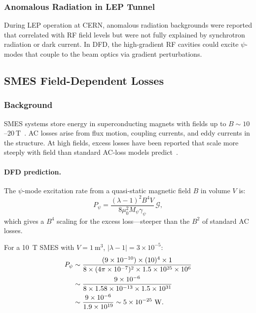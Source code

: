 \documentclass[aps,prd,twocolumn,showpacs,preprintnumbers,superscriptaddress,nofootinbib]{revtex4-2}
\newcommand{\Mpsi}{M_\psi}
\begin{document}
\subsubsection{Anomalous Radiation in LEP Tunnel~\cite{Bartosik2000}}

During LEP operation at CERN, anomalous radiation backgrounds were
reported that correlated with RF field levels but were not fully
explained by synchrotron radiation or dark current.  In DFD, the
high-gradient RF cavities could excite $\psi$-modes that couple to
the beam optics via gradient perturbations.

\subsection{SMES Field-Dependent Losses}\label{sec:smes}

\subsubsection{Background}

SMES systems store energy in superconducting magnets with fields up to
$B \sim 10$--$20~\mathrm{T}$~\cite{Chen2009SMES,Luongo1996}.  AC
losses arise from flux motion, coupling currents, and eddy currents in
the structure.  At high fields, excess losses have been reported that
scale more steeply with field than standard AC-loss models
predict~\cite{Wilson1983,Dresner1995}.

\paragraph{DFD prediction.}
The $\psi$-mode excitation rate from a quasi-static magnetic field $B$
in volume $V$ is:
\begin{equation}
P_\psi = \frac{(\lambda-1)^2 B^4 V}{8\mu_0^2\Mpsi\gamma_\psi}\,\mathcal{G},
\end{equation}
which gives a $B^4$ scaling for the excess loss---steeper than the
$B^2$ of standard AC losses.

For a 10~T SMES with $V = 1~\mathrm{m^3}$,
$|\lambda-1| = 3\times 10^{-5}$:
\begin{align}
P_\psi &\sim \frac{(9\times 10^{-10})\times(10)^4\times 1}{8\times(4\pi\times 10^{-7})^2\times 1.5\times 10^{25}\times 10^6} \notag\\
  &\sim \frac{9\times 10^{-6}}{8\times 1.58\times 10^{-13}\times 1.5\times 10^{31}} \notag\\
  &\sim \frac{9\times 10^{-6}}{1.9\times 10^{19}} \sim 5\times 10^{-25}~\mathrm{W}.
\end{align}
\end{document}
